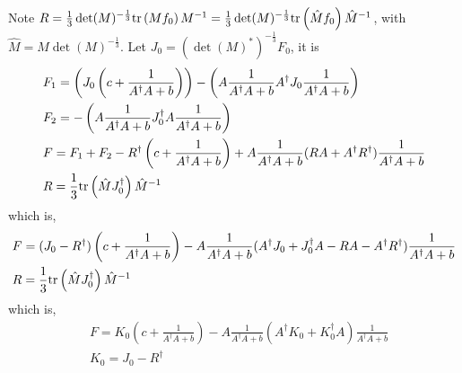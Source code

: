 Note $R=\frac{1}{3}\det(M)^{-\frac{1}{3}} {\rm tr}\left(Mf_0\right) M^{-1}=\frac{1}{3}\det(M)^{-\frac{1}{3}} {\rm tr}\left(\hat{M}f_0\right) \hat{M}^{-1}$, with $\hat{M}=M\det(M)^{-\frac{1}{3}}$.
Let $J_0=(\det(M)^*)^{-\frac{1}{3}} F_0$, it is
\begin{equation}
\begin{split}
&F_1=\left(J_0\left(c+\frac{1}{A^{\dagger}A+b}\right)\right)-\left(A \frac{1}{A^{\dagger}A+b} A^{\dagger}J_0 \frac{1}{A^{\dagger}A+b}\right)\\
&F_2=-\left(A \frac{1}{A^{\dagger}A+b} J_0^{\dagger} A \frac{1}{A^{\dagger}A+b}\right)\\
&F=F_1+F_2-R^{\dagger}\left(c+\frac{1}{A^{\dagger}A+b}\right) + A\frac{1}{A^{\dagger}A+b} (RA+A^{\dagger}R^{\dagger})\frac{1}{A^{\dagger}A+b}\\
&R=\frac{1}{3}{\rm tr}\left(\hat{M}J_0^{\dagger}\right) \hat{M}^{-1}
\end{split}
\end{equation}
which is,
\begin{equation}
\begin{split}
&F=(J_0-R^{\dagger})\left(c+\frac{1}{A^{\dagger}A+b}\right) - A\frac{1}{A^{\dagger}A+b} (A^{\dagger}J_0+J_0^{\dagger} A-RA-A^{\dagger}R^{\dagger})\frac{1}{A^{\dagger}A+b}\\
&R=\frac{1}{3}{\rm tr}\left(\hat{M}J_0^{\dagger}\right) \hat{M}^{-1}
\end{split}
\end{equation}
which is,
\begin{equation}
\begin{split}
&F=K_0\left(c+\frac{1}{A^{\dagger}A+b}\right) - A\frac{1}{A^{\dagger}A+b} (A^{\dagger}K_0+K_0^{\dagger} A)\frac{1}{A^{\dagger}A+b}\\
&K_0=J_0-R^{\dagger}
\end{split}
\end{equation}

